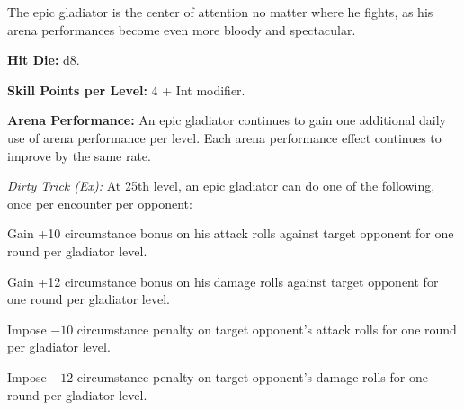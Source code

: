 
The epic gladiator is the center of attention no matter where he fights, as his arena performances become even more bloody and spectacular.

\textbf{Hit Die:} d8.

\textbf{Skill Points per Level:} 4 + Int modifier.

\textbf{Arena Performance:} An epic gladiator continues to gain one additional daily use of arena performance per level. Each arena performance effect continues to improve by the same rate.

\textit{Dirty Trick (Ex):} At 25th level, an epic gladiator can do one of the following, once per encounter per opponent:

\begin{itemize*}
\item Gain +10 circumstance bonus on his attack rolls against target opponent for one round per gladiator level.
\item Gain +12 circumstance bonus on his damage rolls against target opponent for one round per gladiator level.
\item Impose $-10$ circumstance penalty on target opponent's attack rolls for one round per gladiator level.
\item Impose $-12$ circumstance penalty on target opponent's damage rolls for one round per gladiator level.
\end{itemize*}

